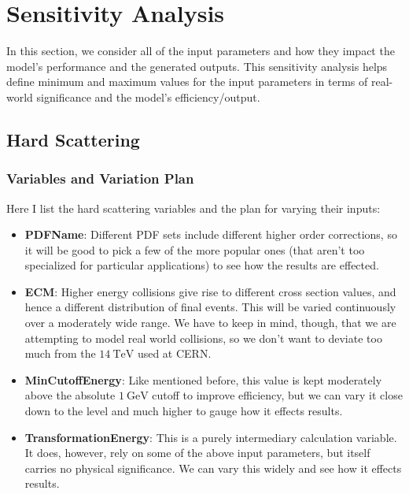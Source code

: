 \section{Sensitivity Analysis}\label{sec:5-sensitivity-scenario}

In this section, we consider all of the input parameters and how they impact the model's performance and the generated outputs. This sensitivity analysis helps define minimum and maximum values for the input parameters in terms of real-world significance and the model's efficiency/output. 

\subsection{Hard Scattering}

\subsubsection{Variables and Variation Plan}

Here I list the hard scattering variables and the plan for varying their inputs:

\begin{itemize}
\item \textbf{PDFName}: Different PDF sets include different higher order corrections, so it will be good to pick a few of the more popular ones (that aren't too specialized for particular applications) to see how the results are effected.
\item \textbf{ECM}: Higher energy collisions give rise to different cross section values, and hence a different distribution of final events. This will be varied continuously over a moderately wide range. We have to keep in mind, though, that we are attempting to model real world collisions, so we don't want to deviate too much from the $\qty{14}{\TeV}$ used at CERN.
\item \textbf{MinCutoffEnergy}: Like mentioned before, this value is kept moderately above the absolute $\qty{1}{\GeV}$ cutoff to improve efficiency, but we can vary it close down to the level and much higher to gauge how it effects results.
\item \textbf{TransformationEnergy}: This is a purely intermediary calculation variable. It does, however, rely on some of the above input parameters, but itself carries no physical significance. We can vary this widely and see how it effects results.
\end{itemize}

